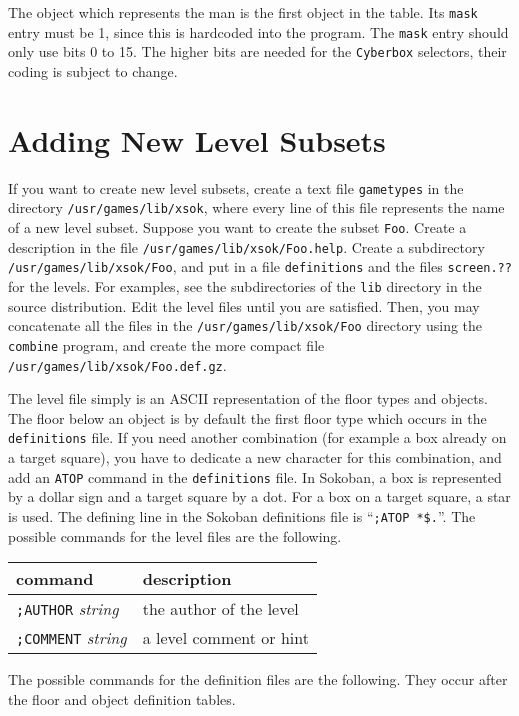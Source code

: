 The object which represents the man is the first object in the table.
Its {\tt mask} entry must be 1, since this is hardcoded into the program.
The {\tt mask} entry should only use bits 0 to 15. The higher bits are
needed for the {\tt Cyberbox} selectors, their coding is subject to change.

\section{Adding New Level Subsets}
If you want to create new level subsets, create a text file {\tt gametypes}
in the directory {\tt /usr/games/lib/xsok}, where every line of this file
represents the name of a new level subset.
Suppose you want to create the subset {\tt Foo}.
Create a description in the file {\tt /usr/games/lib/xsok/Foo.help}.
Create a subdirectory {\tt /usr/games/lib/xsok/Foo}, and put in a file
{\tt definitions} and the files {\tt screen.??} for the levels.
For examples, see the subdirectories of the {\tt lib} directory in the source
distribution.
Edit the level files until you are satisfied. Then, you may concatenate
all the files in the {\tt /usr/games/lib/xsok/Foo} directory using the {\tt
  combine} program, and create the more compact file {\tt
  /usr/games/lib/xsok/Foo.def.gz}.

The level file simply is an ASCII representation of the floor types and
objects. The floor below an object is by default the first floor type which
occurs in the {\tt definitions} file. If you need another combination
(for example a box already on a target square), you have to dedicate
a new character for this combination, and add an {\tt ATOP} command in
the {\tt definitions} file. In Sokoban, a box is represented by a dollar
sign and a target square by a dot. For a box on a target square,
a star is used. The defining line in the Sokoban definitions file is
``{\tt ;ATOP *\$.}''.
The possible commands for the level files are the following.

\begin{center}
\begin{tabular}{|l|l|}
\hline
command & description\\
\hline
{\tt ;AUTHOR} {\em string} & the author of the level\\
{\tt ;COMMENT} {\em string} & a level comment or hint\\
\hline
\end{tabular}
\end{center}

The possible commands for the definition files are the following.
They occur after the floor and object definition tables.

